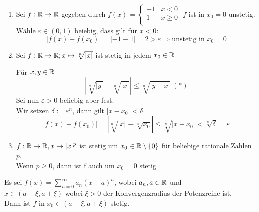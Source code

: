 \documentclass[../ana1u.tex]{subfiles}
\begin{document}
\begin{bspe}
    \begin{enumerate}
        \item Sei \(f: \mathbb{R} \rightarrow \mathbb{R} \) gegeben durch \(f(x) = \left\{
            \begin{array}{ll}
            -1 & x < 0 \\
            1 & x \geq 0 \\
            \end{array}
            \right.\)
            \(f\) ist in \(x_0 = 0 \) unstetig. Wähle \(\varepsilon \in (0,1) \) beiebig, dass gilt für \(x < 0 \):
            \[|f(x)-f(x_0)| = |-1-1| = 2 > \varepsilon \Rightarrow \text{unstetig in } x_0 = 0 \]
        \item Sei \(f: \mathbb{R} \rightarrow \mathbb{R}; x \mapsto \sqrt[n]{|x|} \) ist stetig in jedem \(x_0 \in \mathbb{R} \)
            \begin{bew}
                Für \(x,y \in \mathbb{R} \)
                \[|\sqrt[n]{|y|}-\sqrt[n]{|x|}| \leq \sqrt[n]{|y-x|} \; (*) \]
                Sei nun \(\varepsilon > 0 \) beliebig aber fest. \\
                Wir setzen \(\delta := \varepsilon^n \), dann gilt \(|x-x_0|<\delta \)
                \[|f(x)-f(x_0)| = |\sqrt[n]{|x|} - \sqrt[n]{x_0}| \leq \sqrt[n]{|x-x_0|} < \sqrt[n]{\delta} = \varepsilon \]
            \end{bew}
        \item \(f: \mathbb{R} \rightarrow \mathbb{R}, x \mapsto |x|^p \) ist stetig um \(x_0 \in \mathbb{R} \setminus \{0\} \) 
        für beliebige rationale Zahlen \(p\). \\
        Wenn \(p \geq 0 \), dann ist f auch um \(x_0 = 0 \) stetig
    \end{enumerate}
\end{bspe}
\begin{satz}
    Es sei \(f(x) = \sum_{n=0}^{\infty} a_n(x-a)^n \), wobei \(a_n,a \in \mathbb{R} \) und \\ %
    \(x \in (a - \xi, a + \xi) \) wobei \(\xi > 0 \) der Konvergenzradius der Potenzreihe ist. \\
    Dann ist \(f\) in \(x_0 \in (a-\xi, a+\xi) \) stetig. \\
\end{satz}
\end{document}
